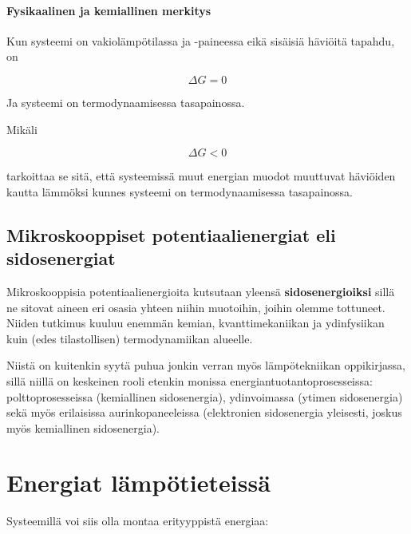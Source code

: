 \documentclass[12pt,a4paper,finnish]{book}
\begin{document}
\paragraph{Fysikaalinen ja kemiallinen merkitys}

Kun systeemi on vakiolämpötilassa ja -paineessa eikä sisäisiä häviöitä tapahdu, on 

\begin{equation}
 \Delta G = 0
\end{equation}

Ja systeemi on termodynaamisessa tasapainossa.

Mikäli

\begin{equation}
 \Delta G < 0
\end{equation}

tarkoittaa se sitä, että systeemissä muut energian muodot muuttuvat häviöiden kautta lämmöksi 
kunnes systeemi on termodynaamisessa tasapainossa.

\subsection{Mikroskooppiset potentiaalienergiat eli sidosenergiat}

Mikroskooppisia potentiaalienergioita kutsutaan yleensä \textbf{sidosenergioiksi} sillä ne sitovat aineen eri osasia 
yhteen niihin muotoihin, joihin olemme tottuneet. Niiden tutkimus kuuluu enemmän kemian, kvanttimekaniikan ja ydinfysiikan 
kuin (edes tilastollisen) termodynamiikan alueelle. 

Niistä on kuitenkin syytä puhua jonkin verran myös lämpötekniikan oppikirjassa, sillä niillä on keskeinen rooli
etenkin monissa energiantuotantoprosesseissa: polttoprosesseissa (kemiallinen sidosenergia), ydinvoimassa (ytimen 
sidosenergia) sekä myös erilaisissa aurinkopaneeleissa (elektronien sidosenergia yleisesti, joskus myös kemiallinen 
sidosenergia).

\section{Energiat lämpötieteissä}

Systeemillä voi siis olla montaa erityyppistä energiaa:
\end{document}
